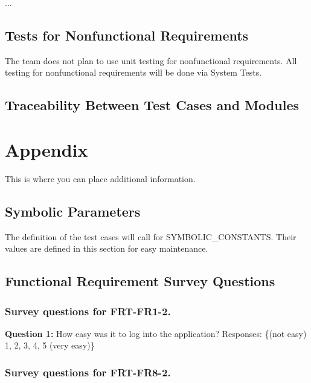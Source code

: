 \documentclass[12pt, titlepage]{article}
\begin{document}
...

\subsection{Tests for Nonfunctional Requirements}

The team does not plan to use unit testing for nonfunctional requirements. All testing for
nonfunctional requirements will be done via System Tests.

\subsection{Traceability Between Test Cases and Modules}

				




\newpage

\section{Appendix}

This is where you can place additional information.

\subsection{Symbolic Parameters}

The definition of the test cases will call for SYMBOLIC\_CONSTANTS.
Their values are defined in this section for easy maintenance.

\subsection{Functional Requirement Survey Questions}
\subsubsection{Survey questions for \textbf{FRT-FR1-2}.}

\noindent \textbf{Question 1:} How easy was it to log into the application?
Responses: \{(not easy) 1, 2, 3, 4, 5 (very easy)\} \\

\subsubsection{Survey questions for \textbf{FRT-FR8-2}.}
\end{document}
